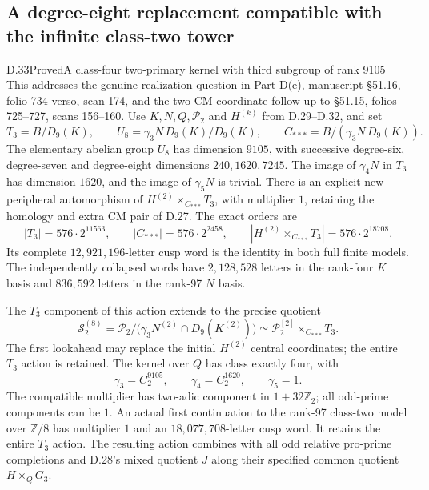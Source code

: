 \subsection{A degree-eight replacement compatible with the infinite class-two tower}

\begin{statement}{D.33}{Proved}{A class-four two-primary kernel with third subgroup of rank 9105}
This addresses the genuine realization question in Part D(e),
manuscript \S51.16, folio 734 verso, scan 174, and the two-CM-coordinate
follow-up to \S51.15, folios 725--727, scans 156--160.
Use $K,N,Q,\mathcal P_2$ and $H^{(k)}$ from D.29--D.32, and set
\[
 T_3=B/D_9(K),\qquad U_8=\gamma_3N\,D_9(K)/D_9(K),\qquad
 C_{***}=B/(\gamma_3N\,D_9(K)).                         \tag{D.33.1}
\]
The elementary abelian group $U_8$ has dimension $9105$, with successive
degree-six, degree-seven and degree-eight dimensions $240,1620,7245$.
The image of $\gamma_4N$ in $T_3$ has dimension $1620$, and the image of
$\gamma_5N$ is trivial. There is an explicit new peripheral automorphism of
$H^{(2)}\times_{C_{***}}T_3$, with multiplier $1$, retaining the homology
and extra CM pair of D.27. The exact orders are
\[
 |T_3|=576\cdot2^{11563},\qquad
 |C_{***}|=576\cdot2^{2458},\qquad
 |H^{(2)}\times_{C_{***}}T_3|=576\cdot2^{18708}.        \tag{D.33.2}
\]
Its complete $12,921,196$-letter cusp word is the identity in both full
finite models. The independently collapsed words have $2,128,528$ letters
in the rank-four $K$ basis and $836,592$ letters in the rank-97 $N$ basis.

The $T_3$ component of this action extends to the precise quotient
\[
 \mathcal S_2^{(8)}=
 \mathcal P_2/\bigl(\overline{\gamma_3N^{(2)}}\cap D_9(K^{(2)})\bigr)
 \simeq \mathcal P_2^{[2]}\times_{C_{***}}T_3.          \tag{D.33.3}
\]
The first lookahead may replace the initial $H^{(2)}$ central coordinates;
the entire $T_3$ action is retained.
The kernel over $Q$ has class exactly four, with
\[
 \gamma_3=C_2^{9105},\qquad \gamma_4=C_2^{1620},\qquad \gamma_5=1.
                                                               \tag{D.33.4}
\]
The compatible multiplier has two-adic component in $1+32\mathbb Z_2$;
all odd-prime components can be $1$. An actual first continuation to
the rank-97 class-two model over $\mathbb Z/8$ has multiplier $1$ and
an $18,077,708$-letter cusp word. It retains the entire $T_3$ action.
The resulting action combines with all odd relative pro-prime
completions and D.28's mixed quotient $J$ along their specified common
quotient $H\times_QG_3$.


\end{statement}
